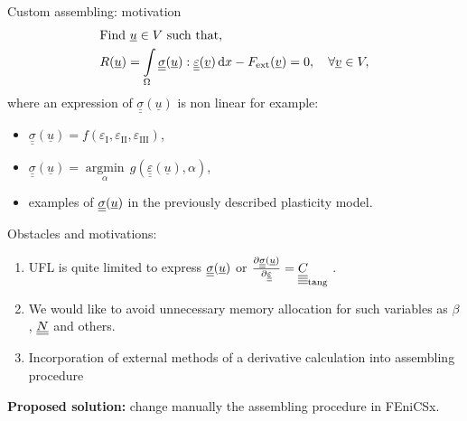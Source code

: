 \documentclass[9pt]{beamer}
\begin{document}
\begin{frame}{Custom assembling: motivation}
  \begin{align}
    & \text{Find } \underline{u} \in V \text{ such that,} \label{eqn:var_from_1} \\ 
    & R(\underline{u}) = \int\limits_\Omega\underline{\underline{\sigma}}(\underline{u}) : \underline{\underline{\varepsilon}}(\underline{v}) \, \mathrm{d} x - F_\text{ext}(\underline{v}) = 0, \quad \forall \underline{v} \in V \label{eqn:var_from_2},
  \end{align}
  where an expression of $\underline{\underline{\sigma}}(\underline{u})$ is non linear for example:
  \begin{itemize}
    \item $\underline{\underline{\sigma}}(\underline{u}) = f(\varepsilon_\text{I}, \varepsilon_\text{II}, \varepsilon_\text{III})$,
    \item $\underline{\underline{\sigma}}(\underline{u}) = \underset{\alpha}{\operatorname{argmin}} \, g(\underline{\underline{\varepsilon}}(\underline{u}),  \alpha)$,
    \item examples of $\underline{\underline{\sigma}}(\underline{u})$ in the previously described plasticity model.
  \end{itemize}

  Obstacles and motivations:
  \begin{enumerate}
    \item UFL is quite limited to express $\underline{\underline{\sigma}}(\underline{u})$ or $\frac{\partial\underline{\underline{\sigma}}(\underline{u})}{\partial\underline{\underline{\varepsilon}}} = \underline{\underline{\underline{\underline{C_{}}}}}_\text{tang}$ .
    \item We would like to avoid unnecessary memory allocation for such variables as $\beta$, $\underline{\underline{N}}$ and others.
    \item Incorporation of external methods of a derivative calculation into assembling procedure
  \end{enumerate}

  \textbf{Proposed solution:} change manually the assembling procedure in FEniCSx.
\end{frame}
\end{document}
